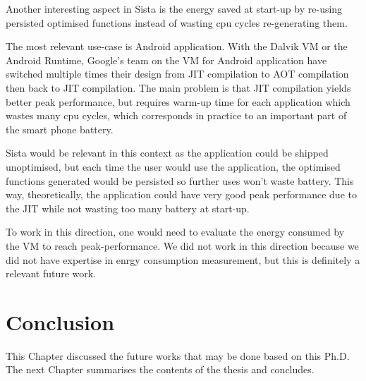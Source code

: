 \documentclass[a4paper,12pt,twoside]{../includes/ThesisStyle}
\begin{document}
Another interesting aspect in Sista is the energy saved at start-up by re-using persisted optimised functions instead of wasting cpu cycles re-generating them. 

The most relevant use-case is Android application. With the Dalvik VM or the Android Runtime, Google's team on the VM for Android application have switched multiple times their design from JIT compilation to AOT compilation then back to JIT compilation. The main problem is that JIT compilation yields better peak performance, but requires warm-up time for each application which wastes many cpu cycles, which corresponds in practice to an important part of the smart phone battery.

Sista would be relevant in this context as the application could be shipped unoptimised, but each time the user would use the application, the optimised functions generated would be persisted so further uses won't waste battery. This way, theoretically, the application could have very good peak performance due to the JIT while not wasting too many battery at start-up.

To work in this direction, one would need to evaluate the energy consumed by the VM to reach peak-performance. We did not work in this direction because we did not have expertise in enrgy consumption measurement, but this is definitely a relevant future work.

\section*{Conclusion}

This Chapter discussed the future works that may be done based on this Ph.D. The next Chapter summarises the contents of the thesis and concludes.

\ifx\wholebook\relax\else
    
\end{document}
